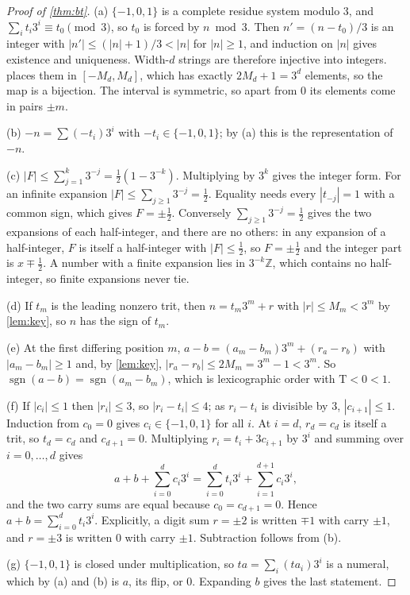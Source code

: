 \documentclass[11pt]{article}
\theoremstyle{definition}\newtheorem{definition}[theorem]{Definition}
\theoremstyle{remark}\newtheorem{remark}[theorem]{Remark}
\newcommand{\T}{\mathrm{T}}
\newcommand{\sgn}{\operatorname{sgn}}
\begin{document}
\begin{proof}[Proof of \cref{thm:bt}]
(a) $\{-1,0,1\}$ is a complete residue system modulo 3, and $\sum_it_i3^i\equiv t_0\pmod3$, so $t_0$ is forced by $n\bmod 3$. Then $n'=(n-t_0)/3$ is an integer with $|n'|\le(|n|+1)/3<|n|$ for $|n|\ge1$, and induction on $|n|$ gives existence and uniqueness. Width-$d$ strings are therefore injective into integers.  places them in $[-M_d,M_d]$, which has exactly $2M_d+1=3^d$ elements, so the map is a bijection. The interval is symmetric, so apart from $0$ its elements come in pairs $\pm m$.

(b) $-n=\sum(-t_i)3^i$ with $-t_i\in\{-1,0,1\}$; by (a) this is the representation of $-n$.

(c) $|F|\le\sum_{j=1}^k3^{-j}=\frac12(1-3^{-k})$. Multiplying by $3^k$ gives the integer form. For an infinite expansion $|F|\le\sum_{j\ge1}3^{-j}=\frac12$. Equality needs every $|t_{-j}|=1$ with a common sign, which gives $F=\pm\frac12$. Conversely $\sum_{j\ge1}3^{-j}=\frac12$ gives the two expansions of each half-integer, and there are no others: in any expansion of a half-integer, $F$ is itself a half-integer with $|F|\le\frac12$, so $F=\pm\frac12$ and the integer part is $x\mp\frac12$. A number with a finite expansion lies in $3^{-k}\mathbb Z$, which contains no half-integer, so finite expansions never tie.

(d) If $t_m$ is the leading nonzero trit, then $n=t_m3^m+r$ with $|r|\le M_m<3^m$ by \cref{lem:key}, so $n$ has the sign of $t_m$.

(e) At the first differing position $m$, $a-b=(a_m-b_m)3^m+(r_a-r_b)$ with $|a_m-b_m|\ge1$ and, by \cref{lem:key}, $|r_a-r_b|\le2M_m=3^m-1<3^m$. So $\sgn(a-b)=\sgn(a_m-b_m)$, which is lexicographic order with $\T<0<1$.

(f) If $|c_i|\le1$ then $|r_i|\le3$, so $|r_i-t_i|\le4$; as $r_i-t_i$ is divisible by $3$, $|c_{i+1}|\le1$. Induction from $c_0=0$ gives $c_i\in\{-1,0,1\}$ for all $i$. At $i=d$, $r_d=c_d$ is itself a trit, so $t_d=c_d$ and $c_{d+1}=0$. Multiplying $r_i=t_i+3c_{i+1}$ by $3^i$ and summing over $i=0,\dots,d$ gives
\[
a+b+\sum_{i=0}^{d}c_i3^i=\sum_{i=0}^{d}t_i3^i+\sum_{i=1}^{d+1}c_i3^i ,
\]
and the two carry sums are equal because $c_0=c_{d+1}=0$. Hence $a+b=\sum_{i=0}^{d}t_i3^i$. Explicitly, a digit sum $r=\pm2$ is written $\mp1$ with carry $\pm1$, and $r=\pm3$ is written $0$ with carry $\pm1$. Subtraction follows from (b).

(g) $\{-1,0,1\}$ is closed under multiplication, so $ta=\sum_i(ta_i)3^i$ is a numeral, which by (a) and (b) is $a$, its flip, or $0$. Expanding $b$ gives the last statement.
\end{proof}
\end{document}
